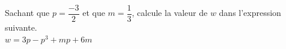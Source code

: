 %
%
Sachant que $p=\dfrac{-3}{2}$ et que $m=\dfrac{1}{3}$, calcule la valeur de $w$ dans l'expression suivante. \\
  $w=3p-p^3+mp+6m$
